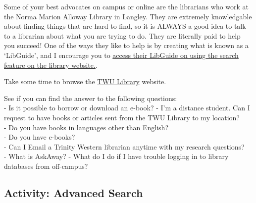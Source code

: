 \documentclass[
]{book}
\theoremstyle{definition}
\theoremstyle{definition}
\theoremstyle{definition}
\theoremstyle{definition}
\theoremstyle{remark}
\begin{document}
\begin{reflect}
Some of your best advocates on campus or online are the librarians who work at the Norma Marion Alloway Library in Langley. They are extremely knowledgable about finding things that are hard to find, so it is ALWAYS a good idea to talk to a librarian about what you are trying to do. They are literally paid to help you succeed! One of the ways they like to help is by creating what is known as a `LibGuide', and I encourage you to \href{https://libguides.twu.ca/LibraryOneSearch}{access their LibGuide on using the search feature on the library website.}.

Take some time to browse the \href{https://www.twu.ca/academics/library}{TWU Library} website.

See if you can find the answer to the following questions:\\
- Is it possible to borrow or download an e-book?
- I'm a distance student. Can I request to have books or articles sent from the TWU Library to my location?\\
- Do you have books in languages other than English?\\
- Do you have e-books?\\
- Can I Email a Trinity Western librarian anytime with my research questions?\\
- What is AskAway?
- What do I do if I have trouble logging in to library databases from off-campus?
\end{reflect}

\hypertarget{activity-advanced-search}{%
\subsection*{Activity: Advanced Search}\label{activity-advanced-search}}
\end{document}

